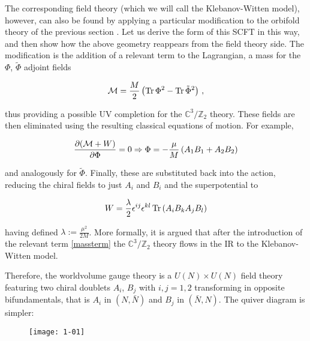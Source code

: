 The corresponding field theory (which we will call the Klebanov-Witten model), however, can also be found by applying a particular modification to the orbifold theory of the previous section \cite{KW_SCFT}. Let us derive the form of this SCFT in this way, and then show how the above geometry reappears from the field theory side. The modification is the addition of a relevant term to the Lagrangian, a mass for the $\Phi$, $\tilde\Phi$ adjoint fields

\begin{equation}
	\mathcal{M} = \frac{M}{2} \left( \operatorname{Tr} \Phi^2 - \operatorname{Tr} \tilde\Phi^2 \right)\,,
	\label{massterm}
\end{equation}

thus providing a possible UV completion for the $\mathbb{C}^3/\mathbb{Z}_2$ theory. These fields are then eliminated using the resulting classical equations of motion. For example,

\begin{equation}
	\frac{\partial(\mathcal{M} + W)}{\partial\Phi} = 0 \Rightarrow \Phi = - \frac{\mu}{M} \left( A_1 B_1 + A_2 B_2 \right)
	\label{}
\end{equation}

and analogously for $\tilde \Phi$. Finally, these are substituted back into the action, reducing the chiral fields to just $A_i$ and $B_i$ and the superpotential to

\begin{equation}
	W = \frac{\lambda}{2} \epsilon^{ij} \epsilon^{kl} \operatorname{Tr} \left( A_i B_k A_j B_l \right)
	\label{kwpotential}
\end{equation}

having defined $\lambda := \frac{\mu^2}{2M}$. More formally, it is argued that after the introduction of the relevant term \eqref{massterm} the $\mathbb{C}^3/\mathbb{Z}_2$ theory flows in the IR to the Klebanov-Witten model.

Therefore, the worldvolume gauge theory is a $U(N)\times U(N)$ field theory featuring two chiral doublets $A_i$, $B_j$ with $i,j = 1,2$ transforming in opposite bifundamentals, that is $A_i$ in $(N,\bar N)$ and $B_j$ in $(\bar N, N)$. The quiver diagram is simpler:

\begin{figure}[H]
	\centering
	\texttt{[image: 1-01]}
\end{figure}

